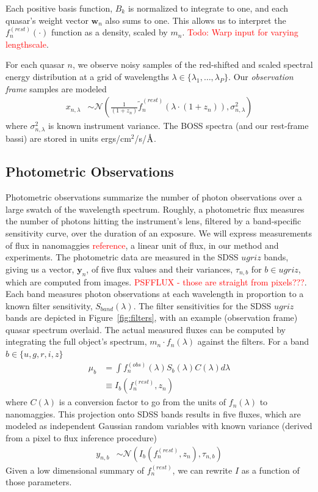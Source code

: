 \documentclass{article}
\newcommand{\angstrom}{\textup{\AA}}
\newcommand{\red}[1]{\textcolor{red}{#1}}
\begin{document}
Each positive basis function, $B_k$ is normalized to integrate to one, and each quasar's weight vector $\mathbf{w}_n$ also sums to one.  This allows us to interpret the $f^{(rest)}_n(\cdot)$ function as a density, scaled by $m_n$. 
\red{Todo: Warp input for varying lengthscale}.  

For each quasar $n$, we observe noisy samples of the red-shifted and scaled spectral energy distribution at a grid of wavelengths $\lambda \in \{\lambda_1, \dots, \lambda_P \}$.  Our \emph{observation frame} samples are modeled
\begin{align}
  x_{n, \lambda} 
    &\sim \mathcal{N}\left( \frac{1}{(1 + z_n)} \tilde f_n^{(rest)}( \lambda \cdot (1 + z_n) ), \sigma_{n,\lambda}^2 \right)
    \label{eq:spec} 
\end{align}
where $\sigma_{n, \lambda}^2$ is known instrument variance. The BOSS spectra (and our rest-frame bassi) are stored in units ergs/cm$^2$/s/$\angstrom$. 

\subsection{Photometric Observations}
Photometric observations summarize the number of photon observations over a large swatch of the wavelength spectrum.  Roughly, a photometric flux measures the number of photons hitting the instrument's lens, filtered by a band-specific sensitivity curve, over the duration of an exposure. 
We will express measurements of flux in nanomaggies \red{reference}, a linear unit of flux, in our method and experiments.  
The photometric data are measured in the SDSS $ugriz$ bands, giving us a vector, $\mathbf{y}_n$, of five flux values and their variances, $\tau_{n, b}$ for $b \in ugriz$, which are computed from images. \red{PSFFLUX - those are straight from pixels???}.  
Each band measures photon observations at each wavelength in proportion to a known filter sensitivity, $S_{band}(\lambda)$. 
The filter sensitivities for the SDSS $ugriz$ bands are depicted in Figure~\ref{fig:filters}, with an example (observation frame) quasar spectrum overlaid.   The actual measured fluxes can be computed by integrating the full object's spectrum, $m_n \cdot f_n(\lambda)$ against the filters.  For a band $b \in \{u, g, r, i, z \}$
\begin{align}
  \mu_b &= \int f^{(obs)}_n(\lambda) S_b(\lambda) C(\lambda) d \lambda  \\
        &\equiv I_b(f_n^{(rest)}, z_n)
\end{align}
where $C(\lambda)$ is a conversion factor to go from the units of $f_n(\lambda)$ to nanomaggies.  This projection onto SDSS bands results in five fluxes, which are modeled as independent Gaussian random variables with known variance (derived from a pixel to flux inference procedure)
\begin{align}
  y_{n,b} &\sim \mathcal{N}( I_b(f_n^{(rest)}, z_n), \tau_{n,b} )
  \label{eq:phot}
\end{align}
Given a low dimensional summary of $f_n^{(rest)}$, we can rewrite $I$ as a function of those parameters. 
\end{document}
